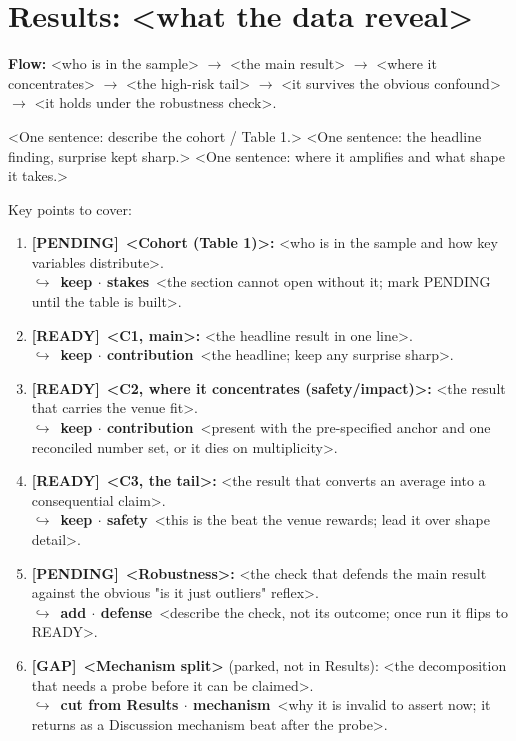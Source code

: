 \documentclass[11pt]{article}
\newcommand{\rdy}{\textcolor{cReady}{\textbf{[READY]}}}   %
\newcommand{\pend}{\textcolor{cPend}{\textbf{[PENDING]}}} %
\newcommand{\gp}{\textcolor{cGap}{\textbf{[GAP]}}}        %
\newcommand{\rev}[2]{\\{\footnotesize\color{gray}$\hookrightarrow$~\textbf{#1}~#2}}
\begin{document}
\section*{Results: <what the data reveal>}

\noindent\textbf{Flow:} <who is in the sample> $\rightarrow$ <the main result> $\rightarrow$ <where it concentrates> $\rightarrow$ <the high-risk tail> $\rightarrow$ <it survives the obvious confound> $\rightarrow$ <it holds under the robustness check>.

<One sentence: describe the cohort / Table 1.>
%
<One sentence: the headline finding, surprise kept sharp.>
%
<One sentence: where it amplifies and what shape it takes.>

Key points to cover:
\begin{enumerate}
\item \pend~\textbf{<Cohort (Table 1)>:} <who is in the sample and how key variables distribute>. \rev{keep $\cdot$ stakes}{<the section cannot open without it; mark PENDING until the table is built>.}
\item \rdy~\textbf{<C1, main>:} <the headline result in one line>. \rev{keep $\cdot$ contribution}{<the headline; keep any surprise sharp>.}
\item \rdy~\textbf{<C2, where it concentrates (safety/impact)>:} <the result that carries the venue fit>. \rev{keep $\cdot$ contribution}{<present with the pre-specified anchor and one reconciled number set, or it dies on multiplicity>.}
\item \rdy~\textbf{<C3, the tail>:} <the result that converts an average into a consequential claim>. \rev{keep $\cdot$ safety}{<this is the beat the venue rewards; lead it over shape detail>.}
\item \pend~\textbf{<Robustness>:} <the check that defends the main result against the obvious "is it just outliers" reflex>. \rev{add $\cdot$ defense}{<describe the check, not its outcome; once run it flips to READY>.}
\item \gp~\textbf{<Mechanism split>} (parked, not in Results): <the decomposition that needs a probe before it can be claimed>. \rev{cut from Results $\cdot$ mechanism}{<why it is invalid to assert now; it returns as a Discussion mechanism beat after the probe>.}
\end{enumerate}

\end{document}
